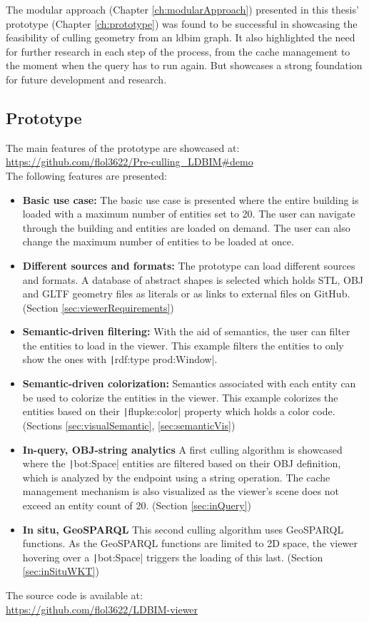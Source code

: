 The modular approach (Chapter \ref{ch:modularApproach}) presented in this thesis' prototype (Chapter \ref{ch:prototype}) was found to be successful in showcasing the feasibility of culling geometry from an \ac{ldbim} graph. It also highlighted the need for further research in each step of the process, from the cache management to the moment when the query has to run again. But showcases a strong foundation for future development and research.

\subsection{Prototype}
The main features of the prototype are showcased at:\\
\url{https://github.com/flol3622/Pre-culling_LDBIM#demo}\\
The following features are presented:

\begin{itemize}
    \item \textbf{Basic use case:} The basic use case is presented where the entire building is loaded with a maximum number of entities set to 20. The user can navigate through the building and entities are loaded on demand. The user can also change the maximum number of entities to be loaded at once.
    \item \textbf{Different sources and formats:} The prototype can load different sources and formats. A database of abstract shapes is selected which holds STL, OBJ and GLTF geometry files as literals or as links to external files on GitHub. (Section \ref{sec:viewerRequirements})
    \item \textbf{Semantic-driven filtering:} With the aid of semantics, the user can filter the entities to load in the viewer. This example filters the entities to only show the ones with \texttt|rdf:type prod:Window|.
    \item \textbf{Semantic-driven colorization:} Semantics associated with each entity can be used to colorize the entities in the viewer. This example colorizes the entities based on their \texttt|flupke:color| property which holds a color code. (Sections \ref{sec:visualSemantic}, \ref{sec:semanticVis})
    \item \textbf{In-query, OBJ-string analytics} A first culling algorithm is showcased where the \texttt|bot:Space| entities are filtered based on their OBJ definition, which is analyzed by the endpoint using a string operation. The cache management mechanism is also visualized as the viewer's scene does not exceed an entity count of 20. (Section \ref{sec:inQuery})
    \item \textbf{In situ, GeoSPARQL} This second culling algorithm uses GeoSPARQL functions. As the GeoSPARQL functions are limited to 2D space, the viewer hovering over a \texttt|bot:Space| triggers the loading of this last. (Section \ref{sec:inSituWKT})
\end{itemize}

The source code is available at:\\
\url{https://github.com/flol3622/LDBIM-viewer}\\



